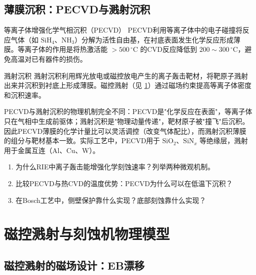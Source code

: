 \subsection{薄膜沉积：PECVD与溅射沉积}

\begin{definition}{等离子体增强化学气相沉积（PECVD）}{}{}
\label{def:pecvd}
PECVD利用等离子体中的电子碰撞将反应气体（如 $\mathrm{SiH}_4$、$\mathrm{NH}_3$）分解为活性自由基，在衬底表面发生化学反应形成薄膜。等离子体的作用是将热激活能 $> 500\,\mathrm{^\circ C}$ 的CVD反应降低到 $200\sim 300\,\mathrm{^\circ C}$，避免高温对已有器件的损伤。
\end{definition}

\begin{definition}{溅射沉积}{}{}
\label{def:sputter-deposition}
溅射沉积利用辉光放电或磁控放电产生的离子轰击靶材，将靶原子溅射出来并沉积到衬底上形成薄膜。磁控溅射（见 \cref{sec:magnetron-sputtering}）通过磁场约束提高等离子体密度和沉积速率。
\end{definition}

\begin{insight}{}{}
PECVD与溅射沉积的物理机制完全不同：PECVD是"化学反应在表面"，等离子体只在气相中生成前驱体；溅射沉积是"物理动量传递"，靶材原子被"撞飞"后沉积。因此PECVD薄膜的化学计量比可以灵活调控（改变气体配比），而溅射沉积薄膜的组分与靶材基本一致。实际工艺中，PECVD用于 $\mathrm{SiO}_2$、$\mathrm{SiN}_x$ 等绝缘层，溅射用于金属互连（Al、Cu、W）。
\end{insight}

\begin{miniquiz}
\begin{enumerate}
\item 为什么RIE中离子轰击能增强化学刻蚀速率？列举两种微观机制。
\item 比较PECVD与热CVD的温度优势：PECVD为什么可以在低温下沉积？
\item 在Bosch工艺中，侧壁保护靠什么实现？底部刻蚀靠什么实现？
\end{enumerate}
\end{miniquiz}

\section{磁控溅射与刻蚀机物理模型}
\label{sec:magnetron-sputtering}

\subsection{磁控溅射的磁场设计：E\times B漂移}

